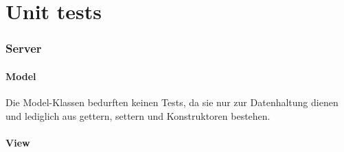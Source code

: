 \documentclass[a4paper]{scrreprt}
\begin{document}
\chapter{Unit tests}
\subsection{Server}

\subsubsection{Model}
Die Model-Klassen bedurften keinen Tests, da sie nur zur Datenhaltung dienen und lediglich aus gettern, settern und Konstruktoren bestehen.

\subsubsection{View}
\end{document}
